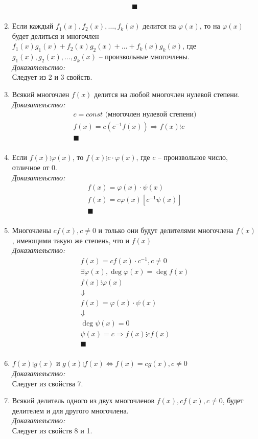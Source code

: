 \documentclass[12pt, fleqn]{article}
\begin{document}
\begin{enumerate}
\begin{multline*}
		\blacksquare\\
	\end{multline*}
	\item Если каждый $f_1(x), f_2(x),\dots ,f_k(x)$ делится на $\varphi(x)$, то на $ \varphi(x)$ будет делиться и многочлен $f_1(x)g_1(x)+f_2(x)g_2(x)+\dots +f_k(x)g_k(x)$, где $g_1(x), g_2(x), \dots ,g_k(x)$ -- произвольные многочлены.\\
	\textit{Доказательство:}\\
	Следует из 2 и 3 свойств.
	\item Всякий многочлен $f(x)$ делится на любой многочлен нулевой степени.\\
	\textit{Доказательство:}
	\begin{multline*}
		c = const \text{ (многочлен нулевой степени)}\\
		f(x)= c\left(c^{-1}f(x)\right)\Rightarrow f(x) \vdots c\\
		\blacksquare\\
	\end{multline*}
	\item Если $f(x)\vdots \varphi(x)$, то $f(x)\vdots c\cdot\varphi(x)$, где $c$ -- произвольное число, отличное от 0.\\
	\textit{Доказательство:}
	\begin{multline*}
		f(x) = \varphi(x) \cdot\psi(x)\\
		f(x)  = c\varphi(x)\left[c^{-1}\psi(x)\right]\\
		\blacksquare\\
	\end{multline*}
	\item Многочлены $cf(x), c\neq0$ и только они будут делителями многочлена $f(x)$, имеющими такую же степень, что и $f(x)$\\
	\textit{Доказательство:}
	\begin{multline*}
		f(x) = cf(x)\cdot c^{-1}, c\neq 0\\
		\exists \varphi(x), \deg \varphi(x) = \deg f(x)\\
		f(x)\vdots \varphi(x)\\
		\Downarrow\\
		f(x) = \varphi(x)\cdot\psi(x)\\
		\Downarrow\\
		\deg\psi(x) = 0\\
		\psi(x) = c \Rightarrow f(x) \vdots cf(x)\\
		\blacksquare\\
	\end{multline*}
	\item $f(x)\vdots g(x)$ и $g(x)\vdots f(x) \Leftrightarrow f(x)=cg(x), c\neq0$\\
	\textit{Доказательство:}\\
	Следует из свойства 7.\\
	 \item Всякий делитель одного из двух многочленов $f(x), cf(x), c\neq0$, будет делителем и для другого многочлена.\\
	 \textit{Доказательство:}\\
	 Следует из свойств 8 и 1.
\end{enumerate}
\end{document}
